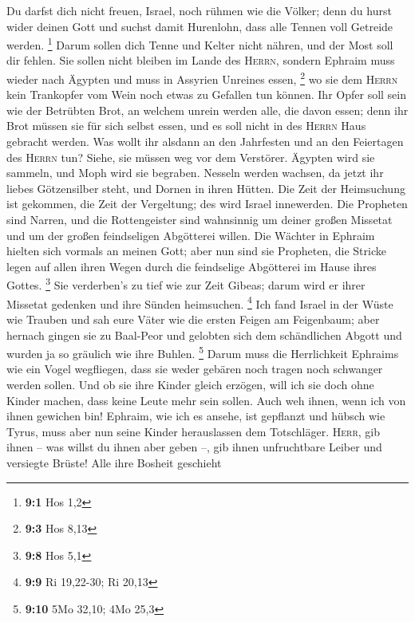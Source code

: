  Du darfst dich nicht freuen, Israel, noch rühmen wie die
Völker; denn du hurst wider deinen Gott und suchst damit Hurenlohn, dass
alle Tennen voll Getreide werden. \footnote{\textbf{9:1} Hos 1,2}
 Darum sollen dich Tenne und Kelter nicht nähren, und der
Most soll dir fehlen.  Sie sollen nicht bleiben im Lande
des \textsc{Herrn}, sondern Ephraim muss wieder nach Ägypten und muss in
Assyrien Unreines essen, \footnote{\textbf{9:3} Hos 8,13} 
wo sie dem \textsc{Herrn} kein Trankopfer vom Wein noch etwas zu
Gefallen tun können. Ihr Opfer soll sein wie der Betrübten Brot, an
welchem unrein werden alle, die davon essen; denn ihr Brot müssen sie
für sich selbst essen, und es soll nicht in des \textsc{Herrn} Haus
gebracht werden.  Was wollt ihr alsdann an den Jahrfesten
und an den Feiertagen des \textsc{Herrn} tun?  Siehe, sie
müssen weg vor dem Verstörer. Ägypten wird sie sammeln, und Moph wird
sie begraben. Nesseln werden wachsen, da jetzt ihr liebes Götzensilber
steht, und Dornen in ihren Hütten.  Die Zeit der
Heimsuchung ist gekommen, die Zeit der Vergeltung; des wird Israel
innewerden. Die Propheten sind Narren, und die Rottengeister sind
wahnsinnig um deiner großen Missetat und um der großen feindseligen
Abgötterei willen.  Die Wächter in Ephraim hielten sich
vormals an meinen Gott; aber nun sind sie Propheten, die Stricke legen
auf allen ihren Wegen durch die feindselige Abgötterei im Hause ihres
Gottes. \footnote{\textbf{9:8} Hos 5,1}  Sie verderben's
zu tief wie zur Zeit Gibeas; darum wird er ihrer Missetat gedenken und
ihre Sünden heimsuchen. \footnote{\textbf{9:9} Ri 19,22-30; Ri 20,13}
 Ich fand Israel in der Wüste wie Trauben und sah eure
Väter wie die ersten Feigen am Feigenbaum; aber hernach gingen sie zu
Baal-Peor und gelobten sich dem schändlichen Abgott und wurden ja so
gräulich wie ihre Buhlen. \footnote{\textbf{9:10} 5Mo 32,10; 4Mo 25,3}
 Darum muss die Herrlichkeit Ephraims wie ein Vogel
wegfliegen, dass sie weder gebären noch tragen noch schwanger werden
sollen.  Und ob sie ihre Kinder gleich erzögen, will ich
sie doch ohne Kinder machen, dass keine Leute mehr sein sollen. Auch weh
ihnen, wenn ich von ihnen gewichen bin!  Ephraim, wie ich
es ansehe, ist gepflanzt und hübsch wie Tyrus, muss aber nun seine
Kinder herauslassen dem Totschläger.  \textsc{Herr}, gib
ihnen -- was willst du ihnen aber geben --, gib ihnen unfruchtbare
Leiber und versiegte Brüste!  Alle ihre Bosheit geschieht
